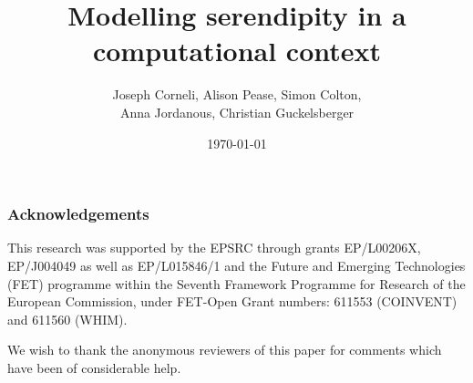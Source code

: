 \documentclass{llncs} %
\begin{document}
\title{Modelling serendipity in a computational context}
\author{Joseph Corneli, Alison Pease, Simon Colton,\\ Anna Jordanous, Christian Guckelsberger}
\date{\today}

\maketitle



\setcounter{footnote}{0}





% 
% 
% 
















\subsubsection*{Acknowledgements}
This research was supported by the EPSRC through grants EP/L00206X, EP/J004049 as well as EP/L015846/1 and the Future and Emerging Technologies (FET) programme
within the Seventh Framework Programme for Research of the European
Commission, under FET-Open Grant numbers: 611553 (COINVENT) and 611560
(WHIM).

We wish to thank the anonymous reviewers of this paper for comments
which have been of considerable help.




% 
\end{document}
